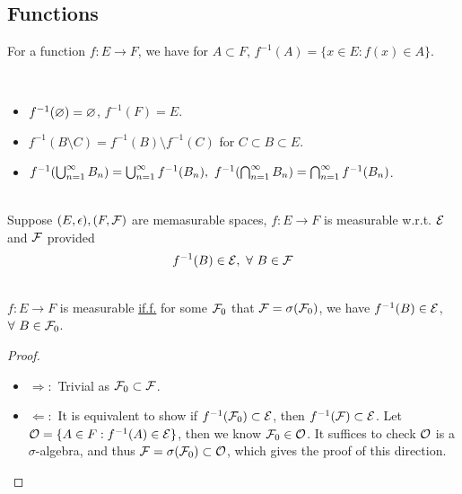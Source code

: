 \vspace{12pt}
\subsection{Functions}

\np For a function $f: E \to F$, we have for $A \subset F$, $f^{-1}(A) = \{x\in E: f(x) \in A\}$.

\begin{lemma}\ 
\begin{itemize}
    \item $f^{-1}(\varnothing) = \varnothing$, $f^{-1}(F) = E$.
    \item $f^{-1}(B \setminus C) = f^{-1}(B) \setminus f^{-1}(C)$ for $C \subset B \subset E$.
    \item $f^{-1}(\bigcup_{n = 1}^{\infty} B_n) = \bigcup_{n=1}^{\infty} f^{-1}(B_n),\ f^{-1} (\bigcap_{n = 1}^{\infty} B_n) = \bigcap_{n = 1}^{\infty} f^{-1}(B_n)$.
\end{itemize}
\end{lemma}

\begin{definition}\ \\
Suppose $(E,\epsilon), (F,\mathcal{F})$ are memasurable spaces, $f:E \to F$ is measurable w.r.t. $\mathcal{E}$ and $\mathcal{F}$ provided 
\begin{equation*}
    f^{-1}(B) \in \mathcal{E},\ \forall\ B \in \mathcal{F}
\end{equation*}
\end{definition}

\vspace{3pt}
\begin{proposition}\ \\
$f:E \to F$ is measurable \underline{if.f.} for some $\mathcal{F}_0$ that $\mathcal{F} = \sigma(\mathcal{F}_0)$, we have $f^{-1}(B) \in \mathcal{E}$, $\forall\ B \in \mathcal{F}_0$.
\end{proposition}
\begin{proof}
\begin{itemize}
    \item $\Rightarrow:$ Trivial as $\mathcal{F}_0 \subset \mathcal{F}$.
    \item $\Leftarrow:$ It is equivalent to show if $f^{-1}(\mathcal{F}_0) \subset \mathcal{E}$, then $f^{-1}(\mathcal{F}) \subset \mathcal{E}$. Let $\mathcal{O} = \{A \in F: f^{-1}(A) \in \mathcal{E} \}$, then we know $\mathcal{F}_0 \in \mathcal{O}$. It suffices to check $\mathcal{O}$ is a $\sigma$-algebra, and thus $\mathcal{F} = \sigma(\mathcal{F}_0) \subset \mathcal{O}$, which gives the proof of this direction.
\end{itemize}
\end{proof}


